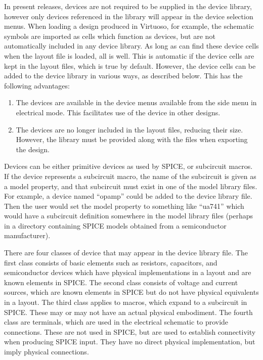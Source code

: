 In present {\Xic} releases, devices are not required to be supplied in
the device library, however only devices referenced in the library
will appear in the device selection menus.  When loading a design
produced in Virtuoso, for example, the schematic symbols are imported
as cells which function as devices, but are not automatically included
in any device library.  As long as {\Xic} can find these device cells
when the layout file is loaded, all is well.  This is automatic if the
device cells are kept in the layout files, which is true by default. 
However, the device cells can be added to the device library in
various ways, as described below.  This has the following advantages:

\begin{enumerate}
\item{The devices are available in the device menus available from the
side menu in electrical mode.  This facilitates use of the device in
other designs.}

\item{The devices are no longer included in the layout files, reducing
their size.  However, the library must be provided along with the
files when exporting the design.}
\end{enumerate}

Devices can be either primitive devices as used by SPICE, or
subcircuit macros.  If the device represents a subcircuit macro, the
name of the subcircuit is given as a {\et model} property, and that
subcircuit must exist in one of the model library files.  For example,
a device named ``opamp'' could be added to the device library file. 
Then the user would set the {\et model} property to something like
``ua741'' which would have a subcircuit definition somewhere in the
model library files (perhaps in a directory containing SPICE models
obtained from a semiconductor manufacturer).

There are four classes of device that may appear in the device library
file.  The first class consists of basic elements such as resistors,
capacitors, and semiconductor devices which have physical
implementations in a layout and are known elements in SPICE.  The
second class consists of voltage and current sources, which are known
elements in SPICE but do not have physical equivalents in a layout. 
The third class applies to macros, which expand to a subcircuit in
SPICE.  These may or may not have an actual physical embodiment.  The
fourth class are terminals, which are used in the electrical schematic
to provide connections.  These are not used in SPICE, but are used to
establish connectivity when producing SPICE input.  They have no
direct physical implementation, but imply physical connections.

